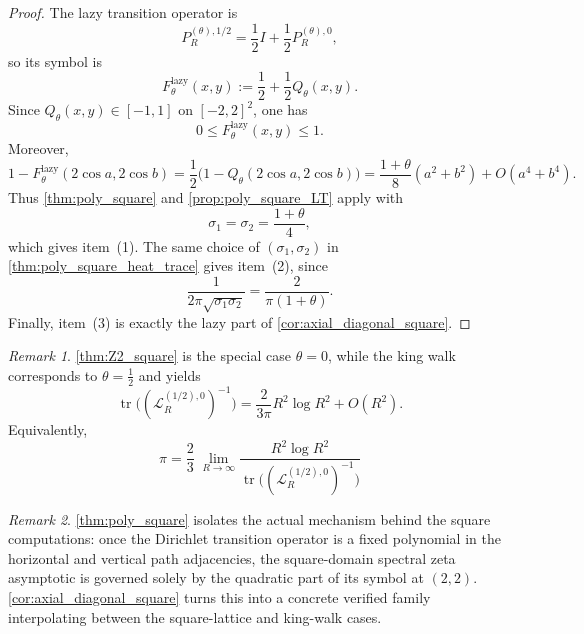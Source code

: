 \documentclass[reqno]{amsart}
\numberwithin{equation}{section}
\theoremstyle{definition}
\theoremstyle{remark}
\newtheorem{remark}[remark]{Remark}
\newcommand{\Cref}[1]{\autoref{#1}}
\DeclareMathOperator{\tr}{tr}
\begin{document}
\begin{proof}
The lazy transition operator is
\[
  P_R^{(\theta),1/2}
  =
  \frac12 I+\frac12 P_R^{(\theta),0},
\]
so its symbol is
\[
  F_\theta^{\mathrm{lazy}}(x,y)
  :=
  \frac12+\frac12 Q_\theta(x,y).
\]
Since $Q_\theta(x,y)\in[-1,1]$ on $[-2,2]^2$, one has
\[
  0\le F_\theta^{\mathrm{lazy}}(x,y)\le 1.
\]
Moreover,
\[
  1-F_\theta^{\mathrm{lazy}}(2\cos a,2\cos b)
  =
  \frac12\bigl(1-Q_\theta(2\cos a,2\cos b)\bigr)
  =
  \frac{1+\theta}{8}(a^2+b^2)+O(a^4+b^4).
\]
Thus \Cref{thm:poly_square} and \Cref{prop:poly_square_LT} apply with
\[
  \sigma_1=\sigma_2=\frac{1+\theta}{4},
\]
which gives item~(1). The same choice of $(\sigma_1,\sigma_2)$ in \Cref{thm:poly_square_heat_trace} gives item~(2), since
\[
  \frac{1}{2\pi\sqrt{\sigma_1\sigma_2}}
  =
  \frac{2}{\pi(1+\theta)}.
\]
Finally, item~(3) is exactly the lazy part of \Cref{cor:axial_diagonal_square}.
\end{proof}

\begin{remark}
\Cref{thm:Z2_square} is the special case $\theta=0$, while the king walk corresponds to $\theta=\frac12$ and yields
\[
  \tr\!\bigl((\mathcal L_R^{(1/2),0})^{-1}\bigr)
  =
  \frac{2}{3\pi}R^2\log R^2+O(R^2).
\]
Equivalently,
\begin{equation}\label{eq:King_pi}
\boxed{\;\displaystyle \pi=\frac{2}{3}\;\lim_{R\to\infty}\frac{R^{2}\log R^{2}}{\tr\!\bigl((\mathcal{L}_R^{(1/2),0})^{-1}\bigr)}\;}
\end{equation}
\end{remark}

\begin{remark}
\Cref{thm:poly_square} isolates the actual mechanism behind the square computations: once the Dirichlet transition operator is a fixed polynomial in the horizontal and vertical path adjacencies, the square-domain spectral zeta asymptotic is governed solely by the quadratic part of its symbol at $(2,2)$. \Cref{cor:axial_diagonal_square} turns this into a concrete verified family interpolating between the square-lattice and king-walk cases.
\end{remark}
\end{document}

